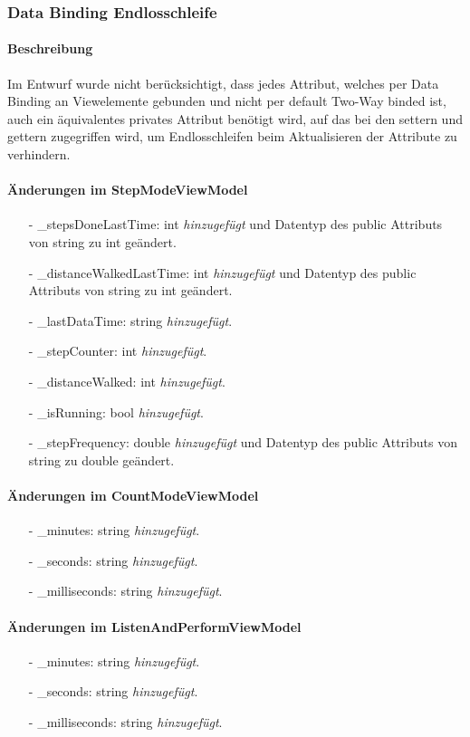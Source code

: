 \documentclass[a4paper,12pt]{article}
\begin{document}
\subsubsection{Data Binding Endlosschleife}
\paragraph{Beschreibung}
Im Entwurf wurde nicht berücksichtigt, dass jedes Attribut, welches per Data Binding an Viewelemente gebunden und nicht per default Two-Way binded ist,  auch ein äquivalentes privates Attribut benötigt wird, auf das bei den settern und gettern zugegriffen wird, um Endlosschleifen beim Aktualisieren der Attribute zu verhindern. 
\paragraph{Änderungen im StepModeViewModel}
\begin{itemize}
	\item[-] \_stepsDoneLastTime: int \textit{hinzugefügt} und Datentyp des public Attributs von string zu int geändert.
	\item[-] \_distanceWalkedLastTime: int \textit{hinzugefügt} und Datentyp des public Attributs von string zu int geändert.
	\item[-] \_lastDataTime: string \textit{hinzugefügt}.
	\item[-] \_stepCounter: int \textit{hinzugefügt}.
	\item[-] \_distanceWalked: int \textit{hinzugefügt}.
	\item[-] \_isRunning: bool \textit{hinzugefügt}.
	\item[-] \_stepFrequency: double \textit{hinzugefügt} und Datentyp des public Attributs von string zu double geändert.
\end{itemize}
\paragraph{Änderungen im CountModeViewModel}
\begin{itemize}
	\item[-] \_minutes: string \textit{hinzugefügt}. 
	\item[-] \_seconds: string \textit{hinzugefügt}.
	\item[-] \_milliseconds: string \textit{hinzugefügt}.
\end{itemize}
\paragraph{Änderungen im ListenAndPerformViewModel}
\begin{itemize}
	\item[-] \_minutes: string \textit{hinzugefügt}.
	\item[-] \_seconds: string \textit{hinzugefügt}.
	\item[-] \_milliseconds: string \textit{hinzugefügt}.
\end{itemize}
\end{document}

